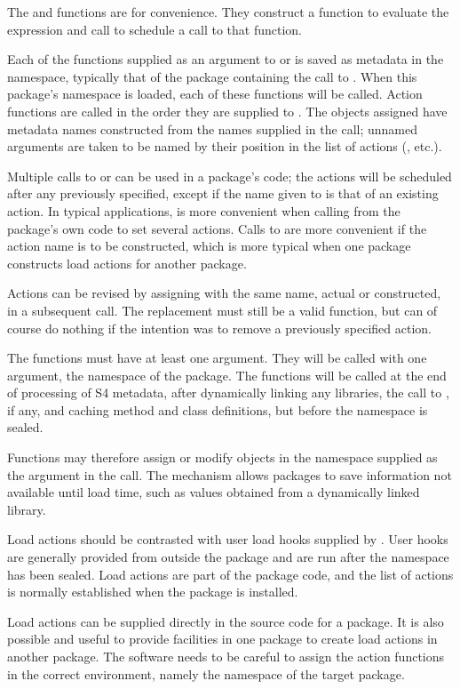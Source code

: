 \begin{Details}\relax
The  and  functions are for
convenience.
They construct a function to evaluate the expression and call
 to schedule a call to that function.

Each of the functions supplied as an argument to  or
 is saved as metadata in the
namespace, typically that of the package containing the call to
.
When this package's namespace is loaded, each of these functions will
be called.
Action functions are called in the order they are supplied to
.
The objects assigned have metadata names constructed from the names
supplied in the call; unnamed arguments are taken to be named by their
position in the list of actions (, etc.).

Multiple calls to  or   can be used in a package's
code; the actions will be scheduled after any previously specified,
except if the name given to  is that of an
existing action.
In typical applications,  is more convenient
when calling from the package's own code to set several actions.
Calls to  are more convenient if the action name
is to be constructed, which is more typical when one package
constructs load actions for another package.

Actions can be revised by assigning with the same name, actual or
constructed, in a subsequent call.
The replacement must still be a valid function, but can of course do
nothing if the intention was to remove a previously specified action.

The functions must have at least one argument.  They will be called
with one argument, the namespace of the package.
The functions will be called at the end of processing of S4 metadata, after
dynamically linking any libraries, the call to , if
any, and caching method and class definitions, but before the namespace is sealed.

Functions may therefore assign or modify objects in the namespace
supplied as the argument in the call.
The mechanism allows packages to save information not available until
load time, such as values obtained from a dynamically linked library.

Load actions should be contrasted with user load hooks supplied by
.
User hooks are generally provided from outside the package and are run
after the namespace has been sealed.
Load actions are part of the package code, and the list of actions is
normally established when the package is installed.


Load actions can be supplied directly in the source code for a package.
It is also possible and useful to provide facilities in one package to
create load actions in another package.
The software needs to be careful to assign the action
functions in the correct environment, namely the namespace of the target
package.

\end{Details}
